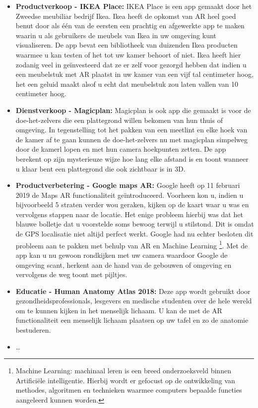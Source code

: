 \begin{itemize}
	\item \textbf{Productverkoop - IKEA Place:} IKEA Place is een app gemaakt door het Zweedse meubiliar bedrijf Ikea. Ikea heeft de opkomst van AR heel goed benut door als één van de eersten een prachtig en afgewerkte app te maken waarin u als gebruikers de meubels van Ikea in uw omgeving kunt visualiseren. De app bevat een bibliotheek van duizenden Ikea producten waarmee u kan testen of het tot uw kamer behoort of niet. Ikea heeft hier zodanig veel in geïnvesteerd dat ze er zelf voor gezorgd hebben dat indien u een meubelstuk met AR plaatst in uw kamer van een vijf tal centimeter hoog, het een geluid maakt alsof u echt dat meubelstuk zou laten vallen van 10 centimeter hoog. 
	\item \textbf{Dienstverkoop - Magicplan:} Magicplan is ook app die gemaakt is voor de doe-het-zelvers die een plattegrond willen bekomen van hun thuis of omgeving. In tegenstelling tot het pakken van een meetlint en elke hoek van de kamer af te gaan kunnen de doe-het-zelvers nu met magicplan simpelweg door de kamerl lopen en met hun camera hoekpunten zetten. De app berekent op zijn mysterieuze wijze hoe lang elke afstand is en toont wanneer u klaar bent een plattegrond die ook zichtbaar is in 3D. 
	\item \textbf{Productverbetering - Google maps AR:} Google heeft op 11 februari 2019 de Maps AR functionaliteit geïntroduceerd. Voorheen kon u, indien u bijvoorbeeld 5 straten verder wou geraken, kijken op de kaart waar u was en vervolgens stappen naar de locatie. Het enige probleem hierbij was dat het blauwe bolletje dat u voorstelde soms bewoog terwijl u stilstond. Dit is omdat de GPS localisatie niet altijd perfect werkt. Google had nu echter besloten dit probleem aan te pakken met behulp van AR en Machine Learning \footnote{Machine Learning: machinaal leren is een breed onderzoeksveld binnen Artificiële intelligentie. Hierbij wordt er gefocust op de ontwikkeling van methodes, algoritmen en technieken waarmee computers bepaalde functies aangeleerd kunnen worden.}. Met de app kan u nu gewoon rondkijken met uw camera waardoor Google de omgeving scant, herkent aan de hand van de gebouwen of omgeving en vervolgens de weg toont met pijltjes. 
	\item \textbf{Educatie - Human Anatomy Atlas 2018:} Deze app wordt gebruikt door gezondheidsprofessionals, lesgevers en medische studenten over de hele wereld om te kunnen kijken in het menselijk lichaam. U kan de met de AR functionaliteit een menselijk lichaam plaatsen op uw tafel en zo de anatomie bestuderen.
	\item \ldots

\end{itemize}

